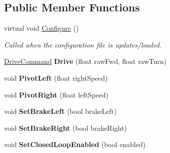 \subsection*{\-Public \-Member \-Functions}
\begin{DoxyCompactItemize}
\item 
\hypertarget{class_closed_loop_rate_drivetrain_ad6eb50e4d4a03905021086d7a96e5db5}{
virtual void \hyperlink{class_closed_loop_rate_drivetrain_ad6eb50e4d4a03905021086d7a96e5db5}{\-Configure} ()}
\label{class_closed_loop_rate_drivetrain_ad6eb50e4d4a03905021086d7a96e5db5}

\begin{DoxyCompactList}\small\item\em \-Called when the configuration file is updates/loaded. \end{DoxyCompactList}\item 
\hypertarget{class_closed_loop_rate_drivetrain_a801d380725a11ad07bcada4ef3a0eba8}{
\hyperlink{struct_drive_command}{\-Drive\-Command} {\bfseries \-Drive} (float raw\-Fwd, float raw\-Turn)}
\label{class_closed_loop_rate_drivetrain_a801d380725a11ad07bcada4ef3a0eba8}

\item 
\hypertarget{class_closed_loop_rate_drivetrain_a45c13dc9928e74c15ffda3fda4f1a2c5}{
void {\bfseries \-Pivot\-Left} (float right\-Speed)}
\label{class_closed_loop_rate_drivetrain_a45c13dc9928e74c15ffda3fda4f1a2c5}

\item 
\hypertarget{class_closed_loop_rate_drivetrain_a3680c07a611082644f613461959d7642}{
void {\bfseries \-Pivot\-Right} (float left\-Speed)}
\label{class_closed_loop_rate_drivetrain_a3680c07a611082644f613461959d7642}

\item 
\hypertarget{class_closed_loop_rate_drivetrain_accc3c75eb08de97cfe1ad696308e165b}{
void {\bfseries \-Set\-Brake\-Left} (bool brake\-Left)}
\label{class_closed_loop_rate_drivetrain_accc3c75eb08de97cfe1ad696308e165b}

\item 
\hypertarget{class_closed_loop_rate_drivetrain_a902be59dd02d0e4dbe9acd3410ff9c06}{
void {\bfseries \-Set\-Brake\-Right} (bool brake\-Right)}
\label{class_closed_loop_rate_drivetrain_a902be59dd02d0e4dbe9acd3410ff9c06}

\item 
\hypertarget{class_closed_loop_rate_drivetrain_a11b51c513d4d9256e4a70030ca0e64f6}{
void {\bfseries \-Set\-Closed\-Loop\-Enabled} (bool enabled)}
\label{class_closed_loop_rate_drivetrain_a11b51c513d4d9256e4a70030ca0e64f6}


\end{DoxyCompactItemize}
